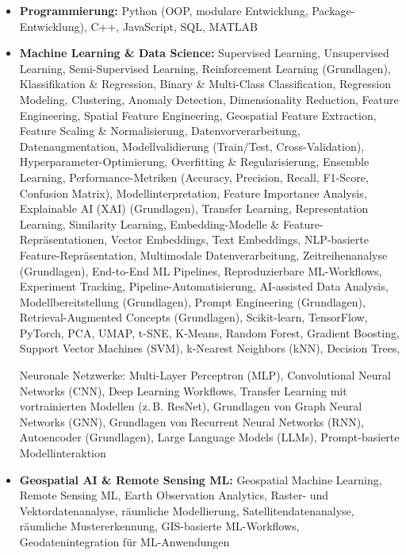 \documentclass[a4paper,10pt]{article}
\begin{document}
\begin{itemize}[leftmargin=*, itemsep=0.3em]

    \item \textbf{Programmierung:} Python (OOP, modulare Entwicklung, Package-Entwicklung), C++, JavaScript, SQL, MATLAB

\item \textbf{Machine Learning \& Data Science:} Supervised Learning, Unsupervised Learning, Semi-Supervised Learning, Reinforcement Learning (Grundlagen), Klassifikation \& Regression, Binary \& Multi-Class Classification, Regression Modeling, Clustering, Anomaly Detection, Dimensionality Reduction, Feature Engineering, Spatial Feature Engineering, Geospatial Feature Extraction, Feature Scaling \& Normalisierung, Datenvorverarbeitung, Datenaugmentation, Modellvalidierung (Train/Test, Cross-Validation), Hyperparameter-Optimierung, Overfitting \& Regularisierung, Ensemble Learning, Performance-Metriken (Accuracy, Precision, Recall, F1-Score, Confusion Matrix), Modellinterpretation, Feature Importance Analysis, Explainable AI (XAI) (Grundlagen), Transfer Learning, Representation Learning, Similarity Learning, Embedding-Modelle \& Feature-Repräsentationen, Vector Embeddings, Text Embeddings, NLP-basierte Feature-Repräsentation, Multimodale Datenverarbeitung, Zeitreihenanalyse (Grundlagen), End-to-End ML Pipelines, Reproduzierbare ML-Workflows, Experiment Tracking, Pipeline-Automatisierung, AI-assisted Data Analysis, Modellbereitstellung (Grundlagen), Prompt Engineering (Grundlagen), Retrieval-Augmented Concepts (Grundlagen), Scikit-learn, TensorFlow, PyTorch, PCA, UMAP, t-SNE, K-Means, Random Forest, Gradient Boosting, Support Vector Machines (SVM), k-Nearest Neighbors (kNN), Decision Trees,

Neuronale Netzwerke: Multi-Layer Perceptron (MLP), Convolutional Neural Networks (CNN), Deep Learning Workflows, Transfer Learning mit vortrainierten Modellen (z.\,B. ResNet), Grundlagen von Graph Neural Networks (GNN), Grundlagen von Recurrent Neural Networks (RNN), Autoencoder (Grundlagen), Large Language Models (LLMs), Prompt-basierte Modellinteraktion

\item \textbf{Geospatial AI \& Remote Sensing ML:} Geospatial Machine Learning, Remote Sensing ML, Earth Observation Analytics, Raster- und Vektordatenanalyse, räumliche Modellierung, Satellitendatenanalyse, räumliche Mustererkennung, GIS-basierte ML-Workflows, Geodatenintegration für ML-Anwendungen


\end{itemize}
\end{document}
